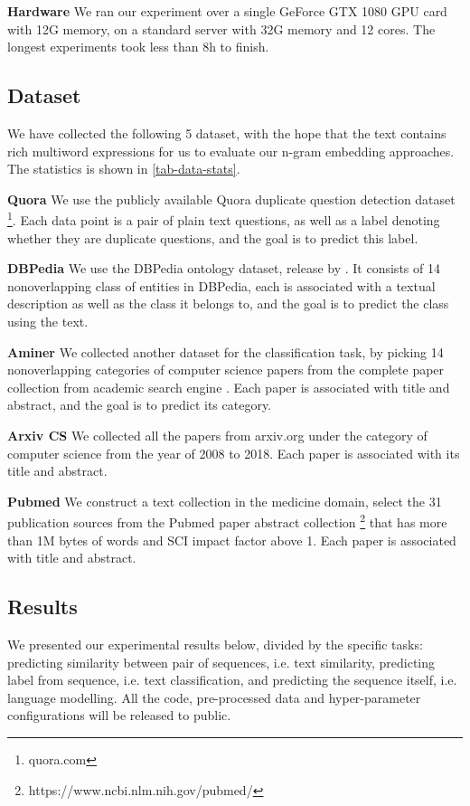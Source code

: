 \noindent \textbf{Hardware}
We ran our experiment over a single GeForce GTX 1080 GPU card with 12G memory, on a standard server with 32G memory and 12 cores. The longest experiments took less than 8h to finish.

\subsection{Dataset}
We have collected the following 5 dataset, with the hope that the text contains rich multiword expressions for us to evaluate our n-gram embedding approaches. The statistics is shown in \autoref{tab-data-stats}. 


\noindent \textbf{Quora} We use the publicly available Quora duplicate question detection dataset \footnote{quora.com}. Each data point is a pair of plain text questions, as well as a label denoting whether they are duplicate questions, and the goal is to predict this label.

\noindent \textbf{DBPedia}
We use the DBPedia ontology dataset, release by \cite{zhang2015character}. 
It consists of 14 nonoverlapping class of entities in DBPedia, each is associated with a textual description as well as the class it belongs to, and the goal is to predict the class using the text.

\noindent \textbf{Aminer}
We collected another dataset for the classification task, by picking 14 nonoverlapping categories of computer science papers from the complete paper collection from academic search engine \cite{Tang08KDD}. Each paper is associated with title and abstract, and the goal is to predict its category.


\noindent \textbf{Arxiv CS}
We collected all the papers from arxiv.org under the category of computer science from the year of 2008 to 2018. Each paper is associated with its title and abstract. 

\noindent \textbf{Pubmed}
We construct a text collection in the medicine domain, 
select the 31 publication sources 
from the Pubmed paper abstract collection \footnote{https://www.ncbi.nlm.nih.gov/pubmed/}
that has more than 1M  bytes of words and SCI impact factor above 1. Each paper is associated with title and abstract.


\subsection{Results}
We presented our experimental results below, divided by the specific tasks: predicting similarity between pair of sequences, i.e. text similarity, 
predicting label from sequence, i.e. text classification, 
and predicting the sequence itself, i.e. language modelling. 
All the code, pre-processed data and hyper-parameter configurations will be released to public.



